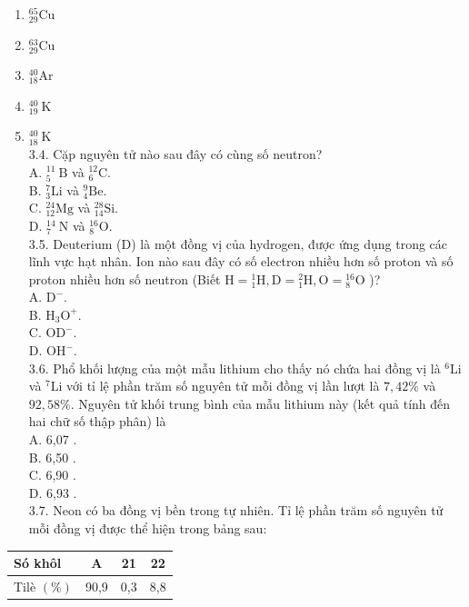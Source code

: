 \documentclass[10pt]{article}
\begin{document}
\begin{enumerate}
  \item ${ }_{29}^{65} \mathrm{Cu}$
  \item ${ }_{29}^{63} \mathrm{Cu}$
  \item ${ }_{18}^{40} \mathrm{Ar}$
  \item ${ }_{19}^{40} \mathrm{~K}$
  \item ${ }_{18}^{40} \mathrm{~K}$\\
3.4. Cặp nguyên tử nào sau đây có cùng số neutron?\\
A. ${ }_{5}^{11} \mathrm{~B}$ và ${ }_{6}^{12} \mathrm{C}$.\\
B. ${ }_{3}^{7} \mathrm{Li}$ và ${ }_{4}^{9} \mathrm{Be}$.\\
C. ${ }_{12}^{24} \mathrm{Mg}$ và ${ }_{14}^{28} \mathrm{Si}$.\\
D. ${ }_{7}^{14} \mathrm{~N}$ và ${ }_{8}^{16} \mathrm{O}$.\\
3.5. Deuterium (D) là một đồng vị của hydrogen, được ứng dụng trong các lĩnh vực hạt nhân. Ion nào sau đây có số electron nhiều hơn số proton và số proton nhiều hơn số neutron (Biết $\mathrm{H}={ }_{1}^{1} \mathrm{H}, \mathrm{D}={ }_{1}^{2} \mathrm{H}, \mathrm{O}={ }_{8}^{16} \mathrm{O}$ )?\\
A. $\mathrm{D}^{-}$.\\
B. $\mathrm{H}_{3} \mathrm{O}^{+}$.\\
C. $\mathrm{OD}^{-}$.\\
D. $\mathrm{OH}^{-}$.\\
3.6. Phổ khối lượng của một mẫu lithium cho thấy nó chứa hai đồng vị là ${ }^{6} \mathrm{Li}$ và ${ }^{7} \mathrm{Li}$ với tỉ lệ phần trăm số nguyên tử mỗi đồng vị lần lượt là $7,42 \%$ và $92,58 \%$. Nguyên tử khối trung bình của mẫu lithium này (kết quả tính đến hai chữ số thập phân) là\\
A. 6,07 .\\
B. 6,50 .\\
C. 6,90 .\\
D. 6,93 .\\
3.7. Neon có ba đồng vị bền trong tự nhiên. Tỉ lệ phần trăm số nguyên tử mỗi đồng vị được thể hiện trong bảng sau:
\end{enumerate}

\begin{center}
\begin{tabular}{|l|c|c|c|}
\hline
Só khôl & A & 21 & 22 \\
\hline
Tilè $(\%)$ & 90,9 & 0,3 & 8,8 \\
\hline
\end{tabular}
\end{center}
\end{document}
